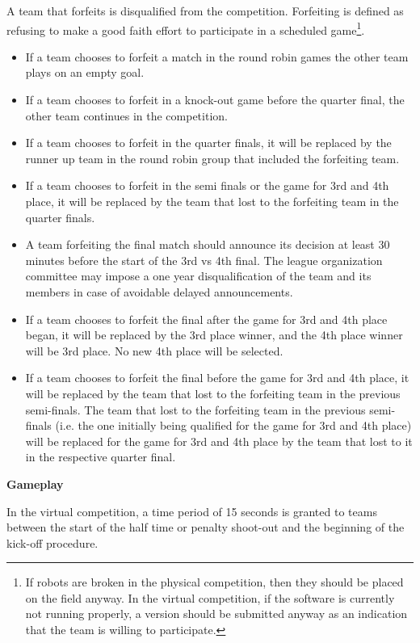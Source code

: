 A team that forfeits is disqualified from the competition. Forfeiting is defined as refusing to make a good faith effort to participate in a scheduled game\footnote{If robots are broken in the physical competition, then they should be placed on the field anyway. In the virtual competition, if the software is currently not running properly, a version should be submitted anyway as an indication that the team is willing to participate.}.
\begin{itemize}
\item If a team chooses to forfeit a match in the round robin games the other team plays on an empty goal.
\item If a team chooses to forfeit in a knock-out game before the quarter final, the other team continues in the competition.
\item If a team chooses to forfeit in the quarter finals, it will be replaced by the runner up team in the round robin group that included the forfeiting team.
\item If a team chooses to forfeit in the semi finals or the game for 3rd and 4th place, it will be replaced by the team that lost to the forfeiting team in the quarter finals.
\item A team forfeiting the final match should announce its decision at least 30 minutes before the start of the 3rd vs 4th final.  The league organization committee may impose a one year disqualification of the team and its members in case of avoidable delayed announcements.
\item If a team chooses to forfeit the final after the game for 3rd and 4th place began, it will be replaced by the 3rd place winner, and the 4th place winner will be 3rd place. No new 4th place will be selected.
\item If a team chooses to forfeit the final before the game for 3rd and 4th place, it will be replaced by the team that lost to the forfeiting team in the previous semi-finals. The team that lost to the forfeiting team in the previous semi-finals (i.e. the one initially being qualified for the game for 3rd and 4th place) will be replaced for the game for 3rd and 4th place by the team that lost to it in the respective quarter final.
\end{itemize}

\bigskip

{\bfseries Gameplay}

\headlinebox

In the virtual competition, a time period of 15 seconds is granted to teams between the start of the half time or penalty shoot-out and the beginning of the kick-off procedure.

